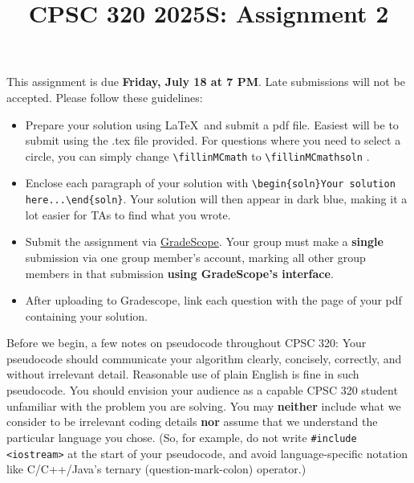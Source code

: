\documentclass[11pt,fleqn]{exam}
\author{}
\date{}
\title{CPSC 320 2025S: Assignment 2}
\newcommand{\fillinMCmath}[1]{\begin{tikzpicture}\draw circle [radius=0.5em];\end{tikzpicture}\ #1}
\newcommand{\fillinMCmathsoln}[1]{\begin{tikzpicture}\draw[black, fill=blue] circle [radius=0.5em];\end{tikzpicture}\ #1}
\newenvironment{soln}{\color{solnblue}}{}
\begin{document}
	
	\maketitle
	\vspace{-0.5in} This assignment is due \textbf{Friday, July 18 at 7 PM}. Late submissions will not be accepted. Please follow these guidelines:
	\begin{itemize}
		\item Prepare your  solution using \LaTeX \ and submit  a pdf file. Easiest will be to submit using
		the .tex file provided. For questions where you  need to select a circle, you can simply
		change \verb~\fillinMCmath~ to \verb~\fillinMCmathsoln~ .
		
		\item Enclose each paragraph of your solution with
		\verb~\begin{soln}Your solution here...\end{soln}~.
		\begin{soln}Your  solution will  then appear  in dark  blue\end{soln}, making  it a  lot
		easier for TAs to find what you wrote.
		
		\item   Submit   the    assignment   via   \href{https://gradescope.ca/}{GradeScope}. Your group must make  a \textbf{single} submission via one
		group member's account, marking all other group members in that submission \textbf{using
			GradeScope's interface}.
		
		\item  After uploading  to  Gradescope, link  each  question  with the  page  of your  pdf
		containing your solution.
	\end{itemize}
	
	Before we  begin, a few  notes on pseudocode throughout  CPSC 320: Your  pseudocode should
	communicate your algorithm  clearly, concisely, correctly, and  without irrelevant detail.
	Reasonable use  of plain  English is  fine in  such pseudocode.  You should  envision your
	audience as a capable CPSC 320 student unfamiliar with the problem you are solving. You may \textbf{neither} include what we consider to be irrelevant coding details \textbf{nor} assume that  we understand the particular  language you
	chose. (So, for example,  do not write \texttt{\#include <iostream>} at  the start of your
	pseudocode,   and    avoid   language-specific   notation   like    C/C++/Java's   ternary
	(question-mark-colon) operator.)
	
\end{document}
